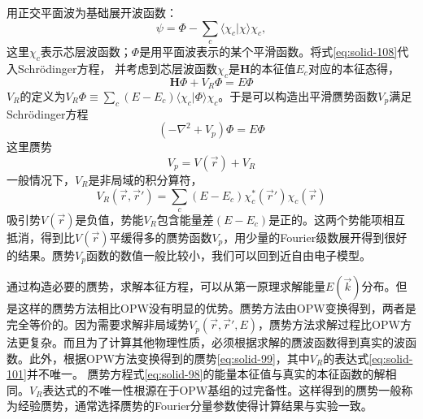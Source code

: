 用正交平面波为基础展开波函数：
\begin{equation}
  \psi=\Phi-\sum_c\langle\chi_c|\chi\rangle\chi_c,
  \label{eq:solid-108}
\end{equation}
这里$\chi_c$表示芯层波函数；$\Phi$是用平面波表示的某个平滑函数。将式\eqref{eq:solid-108}代入Schr\"odinger方程，%
并考虑到芯层波函数$\chi_c$是$\mathbf H$的本征值$E_c$对应的本征态得，%
\begin{equation}
  \mathbf H\Phi+V_R\Phi=E\Phi
  \label{eq:solid-97}
\end{equation}
$V_R$的定义为$V_R\Phi\equiv\sum\limits_c(E-E_c)\langle\chi_c|\Phi\rangle\chi_c$。于是可以构造出平滑赝势函数$V_p$满足Schr\"odinger方程
\begin{equation}
  (-\nabla^2+V_p)\Phi=E\Phi
  \label{eq:solid-98}
\end{equation}
这里赝势
\begin{equation}
  V_p=V(\vec r)+V_R
  \label{eq:solid-99}
\end{equation}
一般情况下，$V_R$是非局域的积分算符，%
\begin{equation}
  V_R(\vec r,\vec r')=\sum_c(E-E_c)\chi_c^{\ast}(\vec r')\chi_c(\vec r)
 \label{eq:solid-101}
\end{equation}
吸引势$V(\vec r)$是负值，势能$V_R$包含能量差$(E-E_c)$是正的。这两个势能项相互抵消，得到比$V(\vec r)$平缓得多的赝势函数$V_p$，用少量的Fourier级数展开得到很好的结果。赝势$V_p$函数的数值一般比较小，我们可以回到近自由电子模型。

通过构造必要的赝势，求解本征方程，可以从第一原理求解能量$E(\vec k)$分布。但是这样的赝势方法相比OPW没有明显的优势。赝势方法由OPW变换得到，两者是完全等价的。因为需要求解非局域势$V_p(\vec r,\vec r',E)$，赝势方法求解过程比OPW方法更复杂。而且为了计算其他物理性质，必须根据求解的赝波函数得到真实的波函数。此外，根据OPW方法变换得到的赝势\eqref{eq:solid-99}，其中$V_R$的表达式\eqref{eq:solid-101}并不唯一。%
赝势方程式\eqref{eq:solid-98}的能量本征值与真实的本征函数的解相同\cite{Harrison}。$V_R$表达式的不唯一性根源在于OPW基组的过完备性。这样得到的赝势一般称为经验赝势，通常选择赝势的Fourier分量参数使得计算结果与实验一致。


